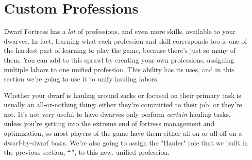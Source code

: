 \documentclass[]{article}
\begin{document}
\section{Custom Professions}
Dwarf Fortress has a \emph{lot} of professions, and even more skills, available to your dwarves. In fact,
learning what each profession and skill corresponds too is one of the hardest part of learning to play
the game, because there's just so many of them. You can add to this sprawl by creating your own
professions, assigning multiple labors to one unified profession. This ability has its uses, and in this
section we're going to use it to unify hauling labors.

Whether your dwarf is hauling around sacks or focused on their primary task is usually an all-or-nothing
thing: either they're committed to their job, or they're not. It's not very useful to have dwarves only
perform \emph{certain} hauling tasks, unless you're getting into the extreme end of fortress management
and optimization, so most players of the game have them either all on or all off on a dwarf-by-dwarf
basis. We're also going to assign the "Hauler" role that we built in the previous section,
\textbf{``"}, to this new, unified profession.
\end{document}
